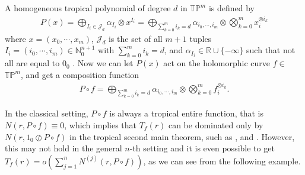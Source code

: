 \documentclass{article}
\begin{document}
A homogeneous tropical polynomial of degree $d$ in $\mathbb{T}\mathbb{P}^{m}$ is defined by
\begin{eqnarray}
    P(x)=\bigoplus_{I_{i}\in \mathcal{J}_{d}}\alpha_{I_{i}}\otimes x^{I_{i}}=\bigoplus_{\sum_{k=0}^{m}i_{k}=d}\alpha_{i_{0}, \cdots, i_{m}}\otimes\bigotimes_{k=0}^{m} x_{i}^{\otimes i_{k}}
\end{eqnarray}
where $x=(x_{0}, \cdots, x_{m})$, $\mathcal{J}_{d}$ is the set of all $m+1$ tuples $I_{i}=(i_{0}, \cdots, i_{m})\in\mathbb{N}_{0}^{n+1}$ with $\sum_{k=0}^{m}i_{k}=d$, and $\alpha_{I_{i}}\in \mathbb{R}\cup\{-\infty\}$ such that not all are equal to $0_{0}$ \cite{Thyp}. Now we can let $P(x)$ act on the holomorphic curve $f\in$ $\mathbb{T}\mathbb{P}^{m}$, and get a composition function
\begin{eqnarray*}
P\circ f=\bigoplus_{\sum_{k=0}^{m}i_{k}=d}\alpha_{i_{0}, \cdots, i_{m}}\otimes\bigotimes_{k=0}^{m} f_{i}^{\otimes i_{k}}.
\end{eqnarray*}

In the classical setting, $P\circ f$ is always a tropical entire function, that is $N(r, P\circ f)\equiv 0$, which implies that $T_{f}(r)$ can be dominated only by $N(r, 1_{0}\oslash P\circ f)$ in the tropical second main theorem, such as \cite[Theorem 5.2]{Secm}, \cite[Theorem 4.8]{Thyp} and \cite[Corollary 3.5]{Tnp}. However, this may not hold in the general $n$-th setting and it is even possible to get $T_{f}(r)=o(\sum_{j=1}^{n}N^{(j)}(r, P\circ f))$, as we can see from the following example.
\end{document}
